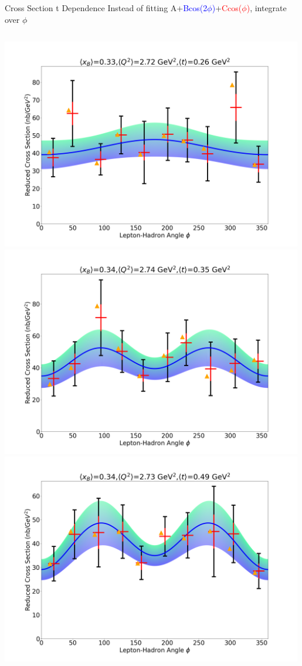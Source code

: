 \documentclass[aspectratio=169]{beamer}
\begin{document}
\begin{frame}{Cross Section t Dependence }
\vspace{-0.2cm}
Instead of fitting A+\textcolor{blue}{Bcos(2$\phi$)}+\textcolor{red}{Ccos($\phi$)}, integrate over $\phi$
\vspace{0.2cm}
\begin{columns}
            \includegraphics[width=0.99\textwidth]{defense/phi_fitting/xqt_302520.png}
            \includegraphics[width=0.99\textwidth]{defense/phi_fitting/xqt_302530.png}
            \includegraphics[width=0.99\textwidth]{defense/phi_fitting/xqt_302540.png}

\end{columns}
\end{frame}
\end{document}
